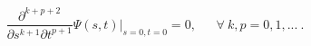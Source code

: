 \begin{equation}
\frac{\partial^{k+p+2}}{\partial s^{k+1}\partial
t^{p+1}}\Psi(s,t)\big|_{s=0 , t=0}=0, \ \ \ \ \ \ \
\forall \  k,p=0,1,... \ .
\label{10}
\end{equation}

